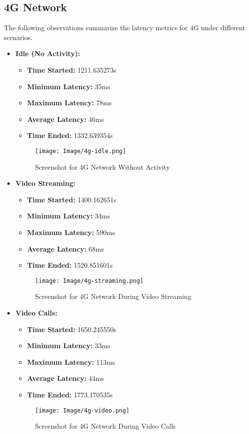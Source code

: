 \documentclass[conference]{IEEEtran}
\begin{document}
\subsection*{4G Network}
The following observations summarize the latency metrics for 4G under different scenarios.
\begin{itemize}
    \item \textbf{Idle (No Activity):}
    \begin{itemize}
        \item \textbf{Time Started:} 1211.635273s
        \item \textbf{Minimum Latency:} 35ms
        \item \textbf{Maximum Latency:} 78ms
        \item \textbf{Average Latency:} 46ms
        \item \textbf{Time Ended:} 1332.639354s
    \end{itemize}
    \begin{figure}[h]
        \centering
        \texttt{[image: Image/4g-idle.png]}
        \caption{Screenshot for 4G Network Without Activity}
        \label{fig:4g_idle}
    \end{figure}

    \item \textbf{Video Streaming:}
    \begin{itemize}
        \item \textbf{Time Started:} 1400.162651s
        \item \textbf{Minimum Latency:} 34ms
        \item \textbf{Maximum Latency:} 590ms
        \item \textbf{Average Latency:} 68ms
        \item \textbf{Time Ended:} 1520.851601s
    \end{itemize}
    \begin{figure}[h]
        \centering
        \texttt{[image: Image/4g-streaming.png]}
        \caption{Screenshot for 4G Network During Video Streaming}
        \label{fig:4g_streaming}
    \end{figure}
\newpage
    \item \textbf{Video Calls:}
    \begin{itemize}
        \item \textbf{Time Started:} 1650.245550s
        \item \textbf{Minimum Latency:} 33ms
        \item \textbf{Maximum Latency:} 113ms
        \item \textbf{Average Latency:} 44ms
        \item \textbf{Time Ended:} 1773.170535s
    \end{itemize}
    \begin{figure}[h]
        \centering
        \texttt{[image: Image/4g-video.png]}
        \caption{Screenshot for 4G Network During Video Calls}
        \label{fig:4g_calls}
    \end{figure}


\end{itemize}
\end{document}
